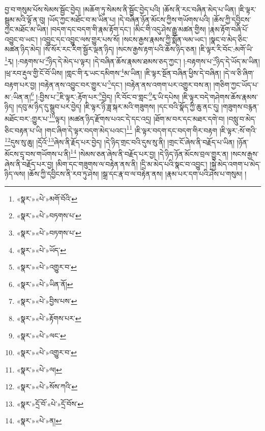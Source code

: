 བྱ་བ་གསུམ་པོས་སེམས་སྦྱོང་བྱེད། །མཆོག་ཏུ་སེམས་ནི་སྦྱོང་བྱེད་པའི། །ཆོས་ནི་རང་བཞིན་མེད་པ་ཡིན། །ཇི་ལྟར་སྦྲུམ་མའི་ལྟོ་ན་བུ། །ཡོད་ཀྱང་མཐོང་བ་མ་ཡིན་པ། །དེ་བཞིན་ཉོན་མོངས་ཀྱིས་གཡོགས་པའི། །ཆོས་ཀྱི་དབྱིངས་ཀྱང་མཐོང་མ་ཡིན། །བདག་དང་བདག་གི་རྣམ་རྟོག་དང་། །མིང་གི་འདུ་ཤེས་རྒྱུ་མཚན་གྱིས། །རྣམ་རྟོག་བཞི་པོ་འབྱུང་བ་ཡང་། །འབྱུང་དང་འབྱུང་ལས་གྱུར་པས་སོ། །སངས་རྒྱས་རྣམས་ཀྱི་སྨོན་ལམ་ཡང་། །སྣང་བ་མེད་ཅིང་མཚན་ཉིད་མེད། །སོ་སོར་རང་རིག་སྦྱོར་ལྡན་ཉིད། །སངས་རྒྱས་རྟག་པའི་ཆོས་ཉིད་ཅན། །ཇི་ལྟར་རི་བོང་:མགོ་ཡི་\footnote{«སྣར་»«པེ་»མགོ་བོའི་}རྭ། །:བརྟགས་པ་\footnote{«སྣར་»«པེ་»བཏགས་པ་}ཉིད་དེ་མེད་པ་ལྟར། །དེ་བཞིན་ཆོས་རྣམས་ཐམས་ཅད་ཀྱང་། །:བརྟགས་པ་\footnote{«སྣར་»«པེ་»བཏགས་པ་}ཉིད་དེ་ཡོད་མ་ཡིན། །ཕྲ་རབ་རྡུལ་གྱི་ངོ་བོ་ཡིས། །གླང་གི་རྭ་ཡང་དམིགས་\footnote{«སྣར་»«པེ་»ཡོད་}མ་ཡིན། །ཇི་ལྟར་སྔོན་བཞིན་ཕྱིས་དེ་བཞིན། །དེ་ལ་ཅི་ཞིག་བརྟག་པར་བྱ། །བརྟེན་ནས་འབྱུང་བར་གྱུར་པ་\footnote{«སྣར་»«པེ་»འགྱུར་བ་}དང་། །བརྟེན་ནས་འགག་པར་འགྱུར་བས་ན། །གཅིག་ཀྱང་ཡོད་པ་མ་:ཡིན་ན།\footnote{«སྣར་»«པེ་»ཡིན་ནོ།} །:བྱིས་པ་\footnote{«སྣར་»«པེ་»བྱིས་པས་}ཇི་ལྟར་:རྟོག་པར་\footnote{«སྣར་»«པེ་»རྟོགས་པར་}བྱེད། །རི་བོང་བ་གླང་\footnote{«སྣར་»«པེ་»ལང་}རྭ་ཡི་དཔེས། །ཇི་ལྟར་བདེ་གཤེགས་ཆོས་རྣམས་ཉིད། །དབུ་མ་ཉིད་དུ་སྒྲུབ་པར་བྱེད། །ཇི་ལྟར་ཉི་ཟླ་སྐར་མའི་གཟུགས། །དང་བའི་སྣོད་ཀྱི་ཆུ་ནང་དུ། །གཟུགས་བརྙན་མཐོང་བར་:གྱུར་པ་\footnote{«སྣར་»«པེ་»འགྱུར་བ་}ལྟར། །མཚན་ཉིད་རྫོགས་པའང་དེ་དང་འདྲ། །ཐོག་མ་བར་དང་མཐར་དགེ་བ། །བསླུ་བ་མེད་ཅིང་བརྟན་པ་ཡི། །གང་ཞིག་དེ་ལྟར་བདག་མེད་པའང་།\footnote{«སྣར་»«པེ་»ལ།} །ཇི་ལྟར་བདག་དང་བདག་གིར་བརྟག །ཇི་ལྟར་:སོ་གའི་\footnote{«སྣར་»«པེ་»སོས་ཀའི་}དུས་སུ་ཆུ། །དྲོའོ་\footnote{«སྣར་»དྲོ་བོ་«པེ་»དྲོ་བོས་}ཞེས་ནི་རྗོད་པར་བྱེད། །དེ་ཉིད་གྲང་བའི་དུས་སུ་ནི། །གྲང་ངོ་ཞེས་ནི་བརྗོད་པ་ཡིན། །ཉོན་མོངས་དྲྭ་བས་གཡོགས་པ་ནི།\footnote{«སྣར་»«པེ་»ན།} །སེམས་ཅན་ཞེས་ནི་བརྗོད་པར་བྱ། །དེ་ཉིད་ཉོན་མོངས་བྲལ་གྱུར་ན། །སངས་རྒྱས་ཞེས་ནི་བརྗོད་པར་བྱ། །མིག་དང་གཟུགས་ལ་བརྟེན་ནས་ནི། །དྲི་མ་མེད་པའི་སྣང་བ་འབྱུང་། །སྐྱེ་མེད་འགག་པ་མེད་ཉིད་ལས། །ཆོས་ཀྱི་དབྱིངས་ནི་རབ་ཏུ་ཤེས། །སྒྲ་དང་རྣ་བ་ལ་བརྟེན་ནས། །རྣམ་པར་དག་པའི་ཤེས་པ་གསུམ། །
